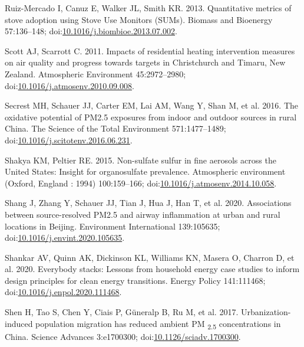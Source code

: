 \documentclass[
  letterpaper,
  DIV=11,
  numbers=noendperiod]{scrartcl}
\newlength{\cslhangindent}
\newenvironment{CSLReferences}[2] %
 {\begin{list}{}{%
  \setlength{\itemindent}{0pt}
  \setlength{\leftmargin}{0pt}
  \setlength{\parsep}{0pt}
  \ifodd #1
   \setlength{\leftmargin}{\cslhangindent}
   \setlength{\itemindent}{-1\cslhangindent}
  \fi
  \setlength{\itemsep}{#2\baselineskip}}}
 {\end{list}}
\begin{document}
\begin{CSLReferences}{1}{1}
Ruiz-Mercado I, Canuz E, Walker JL, Smith KR. 2013. Quantitative metrics
of stove adoption using {Stove Use Monitors} ({SUMs}). Biomass and
Bioenergy 57:136--148;
doi:\href{https://doi.org/10.1016/j.biombioe.2013.07.002}{10.1016/j.biombioe.2013.07.002}.

Scott AJ, Scarrott C. 2011. Impacts of residential heating intervention
measures on air quality and progress towards targets in {Christchurch}
and {Timaru}, {New Zealand}. Atmospheric Environment 45:2972--2980;
doi:\href{https://doi.org/10.1016/j.atmosenv.2010.09.008}{10.1016/j.atmosenv.2010.09.008}.

Secrest MH, Schauer JJ, Carter EM, Lai AM, Wang Y, Shan M, et al. 2016.
The oxidative potential of {PM2}.5 exposures from indoor and outdoor
sources in rural {China}. The Science of the Total Environment
571:1477--1489;
doi:\href{https://doi.org/10.1016/j.scitotenv.2016.06.231}{10.1016/j.scitotenv.2016.06.231}.

Shakya KM, Peltier RE. 2015. Non-sulfate sulfur in fine aerosols across
the {United States}: {Insight} for organosulfate prevalence. Atmospheric
environment (Oxford, England : 1994) 100:159--166;
doi:\href{https://doi.org/10.1016/j.atmosenv.2014.10.058}{10.1016/j.atmosenv.2014.10.058}.

Shang J, Zhang Y, Schauer JJ, Tian J, Hua J, Han T, et al. 2020.
Associations between source-resolved {PM2}.5 and airway inflammation at
urban and rural locations in {Beijing}. Environment International
139:105635;
doi:\href{https://doi.org/10.1016/j.envint.2020.105635}{10.1016/j.envint.2020.105635}.

Shankar AV, Quinn AK, Dickinson KL, Williams KN, Masera O, Charron D, et
al. 2020. Everybody stacks: {Lessons} from household energy case studies
to inform design principles for clean energy transitions. Energy Policy
141:111468;
doi:\href{https://doi.org/10.1016/j.enpol.2020.111468}{10.1016/j.enpol.2020.111468}.

Shen H, Tao S, Chen Y, Ciais P, Güneralp B, Ru M, et al. 2017.
Urbanization-induced population migration has reduced ambient {PM}
{\textsubscript{2.5}} concentrations in {China}. Science Advances
3:e1700300;
doi:\href{https://doi.org/10.1126/sciadv.1700300}{10.1126/sciadv.1700300}.


\end{CSLReferences}
\end{document}
